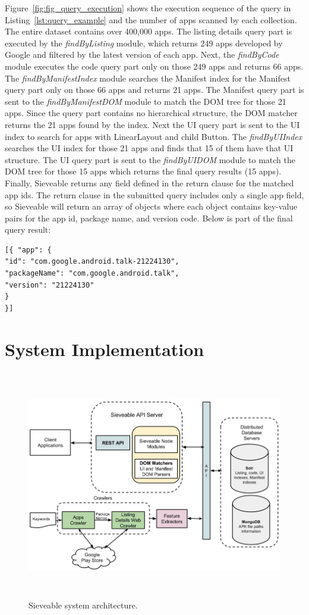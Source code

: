Figure~\ref{fig:fig_query_execution} shows the execution sequence of the query in Listing~\ref{lst:query_example} and the number of apps scanned by each collection.
The entire dataset contains over 400,000 apps.
The listing details query part is executed by the \textit{findByListing} module, which returns 249 apps developed by Google and filtered by the latest version of each app.
Next, the \textit{findByCode} module executes the code query part only on those 249 apps and returns 66 apps.
The \textit{findByManifestIndex} module searches the Manifest index for the Manifest query part only on those 66 apps and returns 21 apps.
The Manifest query part is sent to the \textit{findByManifestDOM} module to match the DOM tree for those 21 apps. Since the query part contains no hierarchical structure, the DOM matcher returns the 21 apps found by the index.
Next the UI query part is sent to the UI index to search for apps with LinearLayout and child Button.
The \textit{findByUIIndex} searches the UI index for those 21 apps  and finds that 15 of them have that UI structure.
The UI query part is sent to the \textit{findByUIDOM} module to match the DOM tree for those 15 apps which returns the final query results (15 apps).
Finally, Sieveable returns any field defined in the return clause for the matched app ids.
The return clause in the submitted query includes only a single app field, so Sieveable will return an array of objects where each object contains key-value pairs for the app id, package name, and version code. Below is part of the final query result:
\begin{verbatim}
[{ "app": { 
"id": "com.google.android.talk-21224130",
"packageName": "com.google.android.talk",
"version": "21224130"
}
}]
\end{verbatim}

\section{System Implementation}
\begin{figure}[!t]
	\centering
	\includegraphics[width=17cm, height=10cm]{figures/sieveable-deep-search/architecture.png}
	\caption{Sieveable system architecture.}
	\label{fig:fig_architecture}
\end{figure}

